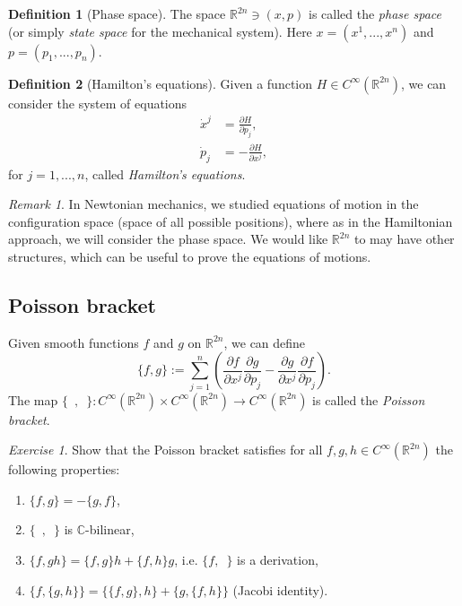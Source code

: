 \documentclass[12pt]{amsart}
\numberwithin{equation}{section}
\theoremstyle{plain}
\theoremstyle{definition}
\newtheorem{defn}{Definition}[subsection]
\theoremstyle{remark}
\newtheorem{rem}{Remark}[subsection]
\newtheorem{exe}{Exercise}[subsection]
\newcommand{\R}{\mathbb{R}}
\begin{document}
\begin{defn}[Phase space]
The space $\R^{2n}\ni (x,p)$ is called the \emph{phase space} (or simply \emph{state space} for the mechanical system). Here $x=(x^1,...,x^n)$ and $p=(p_1,...,p_n)$.
\end{defn}

\begin{defn}[Hamilton's equations]
Given a function $H\in C^\infty(\R^{2n})$, we can consider the system of equations 
\begin{align}
\dot{x}^j&=\frac{\partial H}{\partial p_j},\\
\dot{p}_j&=-\frac{\partial H}{\partial x^j},
\end{align}
for $j=1,...,n$, called \emph{Hamilton's equations}.
\end{defn}

\begin{rem}
In Newtonian mechanics, we studied equations of motion in the configuration space (space of all possible positions), where as in the Hamiltonian approach, we will consider the phase space. We would like $\R^{2n}$ to may have other structures, which can be useful to prove the equations of motions.
\end{rem}

\subsection{Poisson bracket}

Given smooth functions $f$ and $g$ on $\R^{2n}$, we can define 
\begin{equation}
\label{Poisson_bracket}
\{f,g\}:=\sum_{j=1}^n\left(\frac{\partial f}{\partial x^j}\frac{\partial g}{\partial p_j}-\frac{\partial g}{\partial x^j}\frac{\partial f}{\partial p_j}\right).
\end{equation}
The map $\{\enspace,\enspace\}\colon C^\infty(\R^{2n})\times C^\infty(\R^{2n})\to C^\infty(\R^{2n})$ is called the \emph{Poisson bracket}.  

\begin{exe}
Show that the Poisson bracket satisfies for all $f,g,h\in C^\infty(\R^{2n})$ the following properties:
\begin{enumerate}[$(i)$]
\item{$\{f,g\}=-\{g,f\}$,
}
\item{$\{\enspace,\enspace\}$ is $\mathbb{C}$-bilinear,
}
\item{$\{f,gh\}=\{f,g\}h+\{f,h\}g$, i.e. $\{f,\enspace\}$ is a derivation,
}
\item{$\{f,\{g,h\}\}=\{\{f,g\},h\}+\{g,\{f,h\}\}$ (Jacobi identity).
}
\end{enumerate}
\end{exe}
\end{document}
